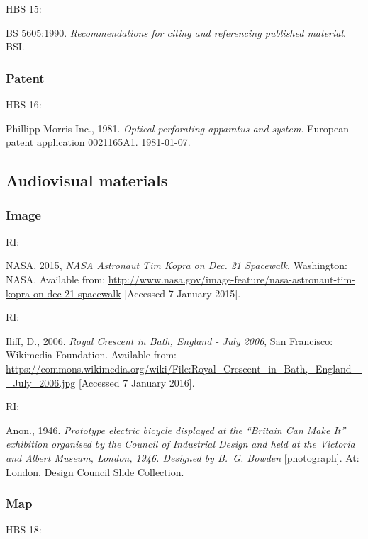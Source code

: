 HBS 15: \cite{bs5605:1990}

BS 5605:1990. \emph{Recommendations for citing and referencing published material}. BSI.



\subsubsection*{Patent}

HBS 16: \cite{pm1981opa}

Phillipp Morris Inc., 1981. \emph{Optical perforating apparatus and system}. European patent application 0021165A1. 1981-01-07.



\subsection{Audiovisual materials}

\subsubsection*{Image}

RI: \cite{nasa2015nat}

NASA, 2015, \emph{NASA Astronaut Tim Kopra on Dec. 21 Spacewalk}. Washington: NASA. Available from: \url{http://www.nasa.gov/image-feature/nasa-astronaut-tim-kopra-on-dec-21-spacewalk} [Accessed 7 January 2015].


RI: \cite{iliff2006rcb}

 Iliff, D., 2006. \emph{Royal Crescent in Bath, England - July 2006}, San Francisco: Wikimedia Foundation. Available from: \url{https://commons.wikimedia.org/wiki/File:Royal_Crescent_in_Bath,_England_-_July_2006.jpg} [Accessed 7 January 2016].


RI: \cite{anon1946peb}

Anon., 1946. \emph{Prototype electric bicycle displayed at the \enquote{Britain Can Make It} exhibition organised by the Council of Industrial Design and held at the Victoria and Albert Museum, London, 1946. Designed by B.~G. Bowden} [photograph]. At: London. Design Council Slide Collection.



\subsubsection*{Map}

HBS 18: \cite{andrews.dury1773wilts}

